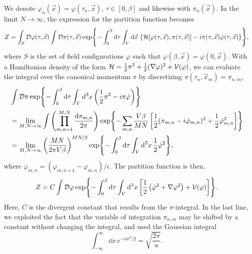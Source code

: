 We denote $\varphi_n(\vec x) = \varphi(\tau_n, \vec x) $, $\tau \in [0, \beta]$ and likewise with $\pi_n(\vec x)$. 
In the limit $N \rightarrow \infty$, the expression for the partition function becomes
\begin{align}
    \label{Thermal partition function}
    Z = \int_S \mathcal{D} \varphi(\tau, \vec x)
    \int \mathcal{D} \pi(\tau, \vec x)
    \exp{
        - \int_0^\beta \dd \tau \int_V \dd \vec x \, 
        \left\{
            \mathcal{H}[\varphi(\tau, \vec x), \pi(\tau, \vec x)]
            - i \pi(\tau, \vec x) \dot \varphi(\tau, \vec x)
        \right\}
        },
\end{align}
where $S$ is the set of field configurations $\varphi$ such that $\varphi(\beta, \vec x) = \varphi(0, \vec x)$.
With a Hamiltonian density of the form $\mathcal{H} = \frac{1}{2} \pi^2 + \frac{1}{2} (\nabla \varphi)^2 + \mathcal{V}(\varphi)$, we can evaluate the integral over the canonical momentum $\pi$ by discretizing $\pi(\tau_n, \vec x_m) = \pi_{n,m}$,
\begin{align*}
    & \int \mathcal{D} \pi \exp{-  \int_0^\beta\dd \tau \int_V \dd^3x 
    \left(
        \frac{1}{2} \pi^2 - i \pi \dot \varphi 
    \right)} \\
    & = \lim_{M,N \rightarrow \infty} \int \left(\prod_{m, n = 1}^{M, N} \frac{\dd \pi_{m, n}}{2 \pi}\right)
    \exp{
        - \sum_{m, n} \frac{V\beta}{MN}
        \left[
            \frac{1}{2}  (\pi_{m, n} - i \dot \varphi_{m, n})^2
            + \frac{1}{2} \dot \varphi_{m, n}^2
        \right]
    } \\
    & = \lim_{M,N \rightarrow \infty} \left( \frac{M N }{2 \pi V \beta} \right)^{MN/2}
    \exp{- \int_0^\beta\dd \tau \int_V \dd^3x \, \frac{1}{2}\dot \varphi^2},
\end{align*}
where $\dot \varphi_{m, n} = (\varphi_{m, n+1} - \varphi_{m, n})/\epsilon$.
The partition function is then, 
\begin{equation}
    Z = C \int \mathcal{D} \varphi
    \exp{
        - \int_0^\beta \dd \tau \int_V \dd^3 x
        \left[
            \frac{1}{2} \left(\dot \varphi^2 + \nabla \varphi^2\right) 
            + \mathcal{V}(\varphi)
        \right]
    }.
\end{equation}
Here, $C$ is the divergent constant that results from the $\pi$-integral.
In the last line, we exploited the fact that the variable of integration $\pi_{n,m}$ may be shifted by a constant without changing the integral, and used the Gaussian integral
\begin{equation*}
    \int_{-\infty}^{\infty} \dd x \, e^{-a x^2/2} = \sqrt{\frac{2 \pi}{a}}.
\end{equation*}


